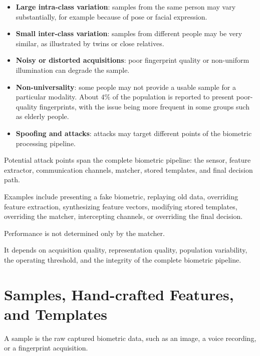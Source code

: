 \documentclass[11pt,a4paper,oneside]{report}
\begin{document}
\begin{itemize}
    \item \textbf{Large intra-class variation}:
    samples from the same person may vary substantially,
    for example because of pose or facial expression.

    \item \textbf{Small inter-class variation}:
    samples from different people may be very similar,
    as illustrated by twins or close relatives.

    \item \textbf{Noisy or distorted acquisitions}:
    poor fingerprint quality or non-uniform illumination can degrade
    the sample.

    \item \textbf{Non-universality}:
    some people may not provide a usable sample for a particular modality.
    About \(4\%\) of the population is reported to present poor-quality
    fingerprints, with the issue being more frequent in some groups such as
    elderly people.

    \item \textbf{Spoofing and attacks}:
    attacks may target different points of the biometric processing
    pipeline.
\end{itemize}

Potential attack points span the complete biometric pipeline: the sensor, feature extractor, communication channels, matcher, stored templates, and final decision path.

Examples include presenting a fake biometric, replaying old data,
overriding feature extraction, synthesizing feature vectors, modifying
stored templates, overriding the matcher, intercepting channels, or
overriding the final decision.

\begin{keyconcept}
Performance is not determined only by the matcher.

It depends on acquisition quality, representation quality, population
variability, the operating threshold, and the integrity of the complete
biometric pipeline.
\end{keyconcept}

\section{Samples, Hand-crafted Features, and Templates}
\label{subsec:samples-features}

\begin{definitionbox}[ -- Sample]
A sample is the raw captured biometric data, such as an image,
a voice recording, or a fingerprint acquisition.
\end{definitionbox}
\end{document}
